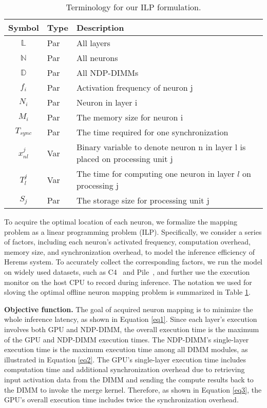 \begin{table}
\caption{Terminology for our ILP formulation.}
\label{tab:terminology}
\scriptsize{
\centering
\begin{tabular}{clp{5cm}}
\hline
\textbf{Symbol} & \textbf{Type} & \textbf{Description} \\[1ex]
\hline
$\mathbb{L}$ &  Par & All layers \\
$\mathbb{N}$ & Par & All neurons \\
$\mathbb{D}$ & Par & All NDP-DIMMs \\ 
$f_{i}$ &  Par & Activation frequency of neuron j \\
$N_{i}$ &  Par & Neuron in layer i \\
$M_{i}$ & Par & The memory size for neuron i \\
$T_{sync}$ &  Par & The time required for one synchronization \\
$x_{nl}^{j}$ &  Var & Binary variable to denote neuron n in layer l is placed on processing unit j \\
$T_{l}^{j}$ & Var & The time for computing one neuron in layer $l$ on processing j \\
$S_{j}$ & Par & The storage size for processing unit j \\
\hline
\end{tabular}
}
\end{table}

To acquire the optimal location of each neuron, we formalize the mapping problem as a linear programming problem (ILP). Specifically, we consider a series of factors, including each neuron's activated frequency, computation overhead, memory size, and synchronization overhead, to model the inference efficiency of Herems system. To accurately collect the corresponding factors, we run the model on widely used datasets, such as C4~\cite{raffel2020exploring} and Pile~\cite{gao2020pile}, and further use the execution monitor on the host CPU to record during inference. The notation we used for sloving the optimal offline neuron mapping problem is summarized in Table \ref{tab:terminology}.

\textbf{Objective function.}
The goal of acquired neuron mapping is to minimize the whole inference latency, as shown in Equation \ref{eq1}. Since each layer's execution involves both GPU and NDP-DIMM, the overall execution time is the maximum of the GPU and NDP-DIMM execution times. The NDP-DIMM's single-layer execution time is the maximum execution time among all DIMM modules, as illustrated in Equation \ref{eq2}. The GPU's single-layer execution time includes computation time and additional synchronization overhead due to retrieving input activation data from the DIMM and sending the compute results back to the DIMM to invoke the merge kernel. Therefore, as shown in Equation \ref{eq3}, the GPU's overall execution time includes twice the synchronization overhead. 

